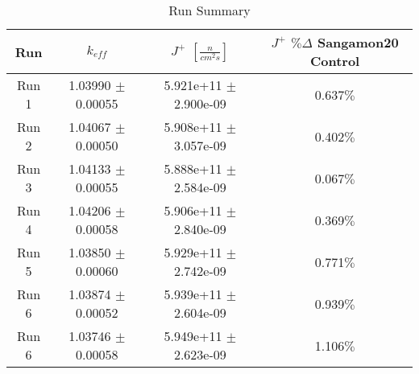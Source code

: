 

\begin{table}[h!]
\centering
 \begin{tabularx}{0.7\textwidth}{c  c  c  c}
 	\hline
 	Run & $k_{eff}$ & $J^+$  $[\frac{n}{cm^2s}]$ & $J^+$ $\% \Delta$ Sangamon20 Control \\
 	\hline
 	Run 1 & 1.03990 $\pm$ 0.00055 & 5.921e+11 $\pm$ 2.900e-09 & 0.637$\%$ \\
 	Run 2 & 1.04067 $\pm$ 0.00050 & 5.908e+11 $\pm$ 3.057e-09 & 0.402$\%$ \\
 	Run 3 & 1.04133 $\pm$ 0.00055 & 5.888e+11 $\pm$ 2.584e-09 & 0.067$\%$  \\
 	Run 4 & 1.04206 $\pm$ 0.00058 & 5.906e+11 $\pm$ 2.840e-09 & 0.369$\%$ \\
 	Run 5 & 1.03850 $\pm$ 0.00060 & 5.929e+11 $\pm$ 2.742e-09 & 0.771$\%$  \\
 	Run 6 & 1.03874 $\pm$ 0.00052 & 5.939e+11 $\pm$ 2.604e-09 & 0.939$\%$ \\
 	Run 6 & 1.03746 $\pm$ 0.00058 & 5.949e+11 $\pm$ 2.623e-09 & 1.106$\%$ \\
 	\hline

 \end{tabularx}
\caption{Run Summary}
\label{table:shufsens}
\end{table}